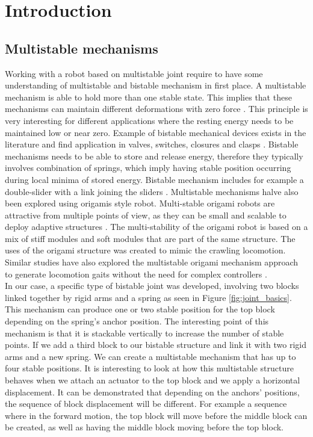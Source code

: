 \chapter{Introduction}
\setcounter{page}{1}

\section{Multistable mechanisms}
    Working with a robot based on multistable joint require to have some understanding of multistable and bistable mechanism in first place. A multistable mechanism is able to hold more than one stable state. This implies that these mechanisms can maintain different deformations with zero force \cite{programmable_multistable_mechanism}. This principle is very interesting for different applications where the resting energy needs to be maintained low or near zero. Example of bistable mechanical devices exists in the literature and find application in valves, switches, closures and clasps \cite{howell}. Bistable mechanisms needs to be able to store and release energy, therefore they typically involves combination of springs, which imply having stable position occurring during local minima of stored energy. Bistable mechanism includes for example a double-slider with a link joining the sliders \cite{howell}.
    Multistable mechanisms halve also been explored using origamis style robot. Multi-stable origami robots are attractive from multiple points of view, as they can be small and scalable to deploy adaptive structures \cite{Pagano_2017}. The multi-stability of the origami robot is based on a mix of stiff modules and soft modules that are part of the same structure. The uses of the origami structure was created to mimic the crawling locomotion. Similar studies have also explored the multistable origami mechanism approach to generate locomotion gaits without the need for complex controllers \cite{peristaltic}.\\
    
    In our case, a specific type of bistable joint was developed, involving two blocks linked together by rigid arms and a spring as seen in Figure \ref{fig:joint_basics}. This mechanism can produce one or two stable position for the top block depending on the spring's anchor position. The interesting point of this mechanism is that it is stackable vertically to increase the number of stable points. If we add a third block to our bistable structure and link it with two rigid arms and a new spring. We can create a multistable mechanism that has up to four stable positions. It is interesting to look at how this multistable structure behaves when we attach an actuator to the top block and we apply a horizontal displacement. It can be demonstrated that depending on the anchors' positions, the sequence of block displacement will be different. For example a sequence where in the forward motion, the top block will move before the middle block can be created, as well as having the middle block moving before the top block. 
    
